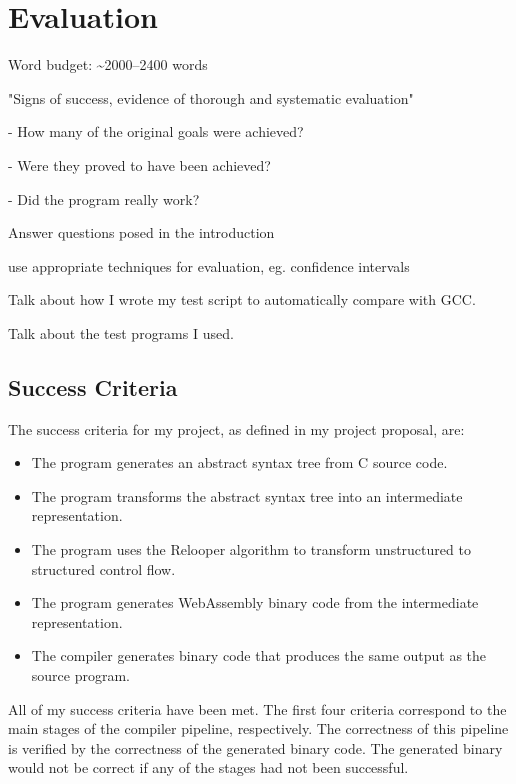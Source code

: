 \documentclass[00-main.tex]{subfiles}
\begin{document}
\chapter{Evaluation}

\begin{Comment}
Word budget: \textasciitilde 2000--2400 words
\end{Comment}

\begin{Comment}
"Signs of success, evidence of thorough and systematic evaluation"

- How many of the original goals were achieved?

- Were they proved to have been achieved?

- Did the program really work?

Answer questions posed in the introduction

use appropriate techniques for evaluation, eg. confidence intervals
\end{Comment}

\begin{Comment}
Talk about how I wrote my test script to automatically compare with GCC.

Talk about the test programs I used.
\end{Comment}


\section{Success Criteria}

The success criteria for my project, as defined in my project proposal, are:
\begin{itemize}
\item The program generates an abstract syntax tree from C source code.
\item The program transforms the abstract syntax tree into an intermediate representation.
\item The program uses the Relooper algorithm to transform unstructured to structured control
flow.
\item The program generates WebAssembly binary code from the intermediate representation.
\item The compiler generates binary code that produces the same output as the source program.
\end{itemize}

All of my success criteria have been met.
The first four criteria correspond to the main stages of the compiler pipeline, respectively.
The correctness of this pipeline is verified by the correctness of the generated binary code.
The generated binary would not be correct if any of the stages had not been successful.
\end{document}
